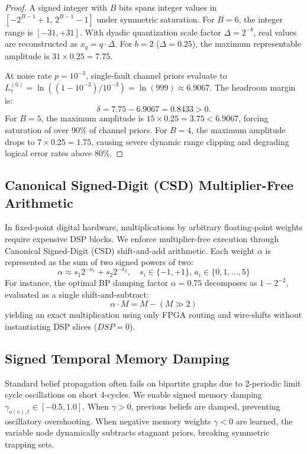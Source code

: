 \documentclass[journal]{IEEEtran}
\begin{document}
\begin{proof}
A signed integer with $B$ bits spans integer values in $[-2^{B-1}+1, \, 2^{B-1}-1]$ under symmetric saturation. For $B=6$, the integer range is $[-31, +31]$. With dyadic quantization scale factor $\Delta = 2^{-b}$, real values are reconstructed as $x_q = q \cdot \Delta$. For $b=2$ ($\Delta = 0.25$), the maximum representable amplitude is $31 \times 0.25 = 7.75$.

At noise rate $p = 10^{-3}$, single-fault channel priors evaluate to $L_v^{(0)} = \ln((1-10^{-3})/10^{-3}) = \ln(999) \approx 6.9067$. The headroom margin is:
\begin{equation}
    \delta = 7.75 - 6.9067 = 0.8433 > 0.
\end{equation}
For $B=5$, the maximum amplitude is $15 \times 0.25 = 3.75 < 6.9067$, forcing saturation of over $90\%$ of channel priors. For $B=4$, the maximum amplitude drops to $7 \times 0.25 = 1.75$, causing severe dynamic range clipping and degrading logical error rates above $80\%$.
\end{proof}

\subsection{Canonical Signed-Digit (CSD) Multiplier-Free Arithmetic}
In fixed-point digital hardware, multiplications by arbitrary floating-point weights require expensive DSP blocks. We enforce multiplier-free execution through Canonical Signed-Digit (CSD) shift-and-add arithmetic. Each weight $\alpha$ is represented as the sum of two signed powers of two:
\begin{equation}
    \alpha \approx s_1 2^{-a_1} + s_2 2^{-a_2}, \quad s_i \in \{-1, +1\}, \, a_i \in \{0, 1, \dots, 5\}
\end{equation}
For instance, the optimal BP damping factor $\alpha = 0.75$ decomposes as $1 - 2^{-2}$, evaluated as a single shift-and-subtract:
\begin{equation}
    \alpha \cdot M = M - (M \gg 2)
\end{equation}
yielding an exact multiplication using only FPGA routing and wire-shifts without instantiating DSP slices ($DSP=0$).

\subsection{Signed Temporal Memory Damping}
Standard belief propagation often fails on bipartite graphs due to 2-periodic limit cycle oscillations on short 4-cycles. We enable signed memory damping $\gamma_{o(v), t} \in [-0.5, 1.0]$. When $\gamma > 0$, previous beliefs are damped, preventing oscillatory overshooting. When negative memory weights $\gamma < 0$ are learned, the variable node dynamically subtracts stagnant priors, breaking symmetric trapping sets.
\end{document}
